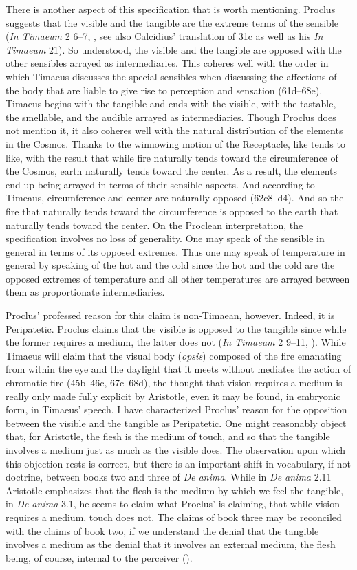 There is another aspect of this specification that is worth mentioning. Proclus suggests that the visible and the tangible are the extreme terms of the sensible (\emph{In Timaeum} 2 6--7, \citealt{Diehl:1903re}, see also Calcidius' translation of 31c as well as his \emph{In Timaeum} 21). So understood, the visible and the tangible are opposed with the other sensibles arrayed as intermediaries. This coheres well with the order in which Timaeus discusses the special sensibles when discussing the affections of the body that are liable to give rise to perception and sensation (61d--68e). Timaeus begins with the tangible and ends with the visible, with the tastable, the smellable, and the audible arrayed as intermediaries. Though Proclus does not mention it, it also coheres well with the natural distribution of the elements in the Cosmos. Thanks to the winnowing motion of the Receptacle, like tends to like, with the result that while fire naturally tends toward the circumference of the Cosmos, earth naturally tends toward the center. As a result, the elements end up being arrayed in terms of their sensible aspects. And according to Timeaus, circumference and center are naturally opposed (62c8–d4). And so the fire that naturally tends toward the circumference is opposed to the earth that naturally tends toward the center. On the Proclean interpretation, the specification involves no loss of generality. One may speak of the sensible in general in terms of its opposed extremes. Thus one may speak of temperature in general by speaking of the hot and the cold since the hot and the cold are the opposed extremes of temperature and all other temperatures are arrayed between them as proportionate intermediaries.

Proclus' professed reason for this claim is non-Timaean, however. Indeed, it is Peripatetic. Proclus claims that the visible is opposed to the tangible since while the former requires a medium, the latter does not (\emph{In Timaeum} 2 9--11, \citealt{Diehl:1903re}). While Timaeus will claim that the visual body (\emph{opsis}) composed of the fire emanating from within the eye and the daylight that it meets without mediates the action of chromatic fire (45b--46c, 67c--68d), the thought that vision requires a medium is really only made fully explicit by Aristotle, even it may be found, in embryonic form, in Timaeus' speech. I have characterized Proclus' reason for the opposition between the visible and the tangible as Peripatetic. One might reasonably object that, for Aristotle, the flesh is the medium of touch, and so that the tangible involves a medium just as much as the visible does. The observation upon which this objection rests is correct, but there is an important shift in vocabulary, if not doctrine, between books two and three of \emph{De anima}. While in \emph{De anima} 2.11 Aristotle emphasizes that the flesh is the medium by which we feel the tangible, in \emph{De anima} 3.1, he seems to claim what Proclus' is claiming, that while vision requires a medium, touch does not. The claims of book three may be reconciled with the claims of book two, if we understand the denial that the tangible involves a medium as the denial that it involves an external medium, the flesh being, of course, internal to the perceiver (\citealt[chapter 2.1.3]{Kalderon:2015fr}). 

